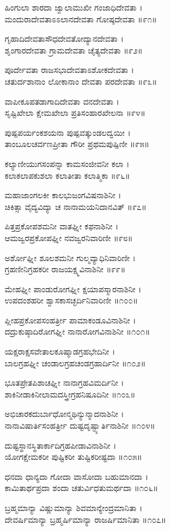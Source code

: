 ಹಿಂಗುಲಾ ಶಾರದಾ ಜ್ವಾಲಾಮುಖೀ ಗಂಜಾಧಿದೇವತಾ ।\\
ಮಂದುರಾದೇವತಾಽಽಲಾನದೇವತಾ ಗೋಷ್ಠದೇವತಾ ॥೯೧॥

ಗೃಹಾದಿದೇವತಾಸೌಧದೇವತೋದ್ಯಾನದೇವತಾ ।\\
ಶೃಂಗಾರದೇವತಾ ಗ್ರಾಮದೇವತಾ ಚೈತ್ಯದೇವತಾ ॥೯೨॥

ಪೂರ್ದೇವತಾ ರಾಜಸಭಾದೇವತಾಽಶೋಕದೇವತಾ ।\\
ಚತುರ್ದಶಾನಾಂ ಲೋಕಾನಾಂ ದೇವತಾ ಪರದೇವತಾ ॥೯೩॥

ವಾಪೀಕೂಪತಡಾಗಾದಿದೇವತಾ ವನದೇವತಾ ।\\
ಸೃಷ್ಟಿಖೇಲಾ ಕ್ಷೇಮಖೇಲಾ ಪ್ರತಿಸಂಹಾರಖೇಲನಾ ॥೯೪॥

ಪುಷ್ಪಪರ್ಯಂಕಶಯನಾ ಪುಷ್ಪವತ್ಕುಂಡಲದ್ವಯೀ ।\\
ತಾಂಬೂಲಚರ್ವಣಪ್ರೀತಾ ಗೌರೀ ಪ್ರಥಮಪುಷ್ಪಿಣೀ ॥೯೫॥

ಕಲ್ಯಾಣೀಯುಗಸಂಪನ್ನಾ ಕಾಮಸಂಜೀವನೀ ಕಲಾ ।\\
ಕಲಾಕಲಾಪಕುಶಲಾ ಕಲಾತೀತಾ ಕಲಾತ್ಮಿಕಾ ॥೯೬॥

ಮಹಾಜಾಂಗಲಕೀ ಕಾಲಭುಜಂಗವಿಷನಾಶಿನೀ ।\\
ಚಿಕಿತ್ಸಾ ವೈದ್ಯವಿದ್ಯಾ ಚ ನಾನಾಮಯನಿದಾನವಿತ್ ॥೯೭॥

ಪಿತ್ತಪ್ರಕೋಪಶಮನೀ ವಾತಘ್ನೀ ಕಫನಾಶಿನೀ ।\\
ಆಮಜ್ವರಪ್ರಕೋಪಘ್ನೀ ನವಜ್ವರನಿವಾರಿಣೀ ॥೯೮॥

ಅರ್ಶೋಘ್ನೀ ಶೂಲಶಮನೀ ಗುಲ್ಮವ್ಯಾಧಿನಿವಾರಿಣೀ ।\\
ಗ್ರಹಣೀನಿಗ್ರಹಕರೀ ರಾಜಯಕ್ಷ್ಮವಿನಾಶಿನೀ ॥೯೯॥

ಮೇಹಘ್ನೀ ಪಾಂಡುರೋಗಘ್ನೀ ಕ್ಷಯಾಪಸ್ಮಾರನಾಶಿನೀ ।\\
ಉಪದಂಶಹರೀ ಶ್ವಾಸಕಾಸಚ್ಛರ್ದಿನಿವಾರಿಣೀ ॥೧೦೦॥

ಪ್ಲೀಹಪ್ರಕೋಪಸಂಹರ್ತ್ರೀ ಪಾಮಾಕಂಡೂವಿನಾಶಿನೀ ।\\
ದದ್ರುಕುಷ್ಠಾದಿರೋಗಘ್ನೀ ನಾನಾರೋಗವಿನಾಶಿನೀ ॥೧೦೧॥

ಯಕ್ಷರಾಕ್ಷಸವೇತಾಲಕೂಷ್ಮಾಡಗ್ರಹಭೇದಿನೀ ।\\
ಬಾಲಗ್ರಹಘ್ನೀ ಚಂಡಾಲಗ್ರಹಚಂಡಗ್ರಹಾರ್ದಿನೀ ॥೧೦೨॥

ಭೂತಪ್ರೇತಪಿಶಾಚಘ್ನೀ ನಾನಾಗ್ರಹವಿಮರ್ದಿನೀ ।\\
ಶಾಕಿನೀಡಾಕಿನೀಲಾಮದಸ್ತ್ರೀಗ್ರಹನಿಷೂದಿನೀ ॥೧೦೩॥

ಅಭಿಚಾರಕದುರ್ಬಾಧೋನ್ಮಥಿನ್ಯುನ್ಮಾದನಾಶಿನೀ ।\\
ನಾನಾವಿಷಾರ್ತಿಸಂಹರ್ತ್ರೀ ದುಷ್ಟದೃಷ್ಟ್ಯಾರ್ತಿನಾಶಿನೀ ॥೧೦೪॥

ದುಷ್ಟಸ್ಥಾನಸ್ಥಿತಾರ್ಕಾದಿಗ್ರಹಪೀಡಾವಿನಾಶಿನೀ ।\\
ಯೋಗಕ್ಷೇಮಕರೀ ಪುಷ್ಟಿಕರೀ ತುಷ್ಟಿಕರೀಷ್ಟದಾ ॥೧೦೫॥

ಧನದಾ ಧಾನ್ಯದಾ ಗೋದಾ ವಾಸೋದಾ ಬಹುಮಾನದಾ ।\\
ಕಾಮಿತಾರ್ಥಪ್ರದಾ ಶಂದಾ ಚತುರ್ವಿಧತುಮರ್ಥದಾ ॥೧೦೬॥

ಬ್ರಹ್ಮಮಾನ್ಯಾ ವಿಷ್ಣುಮಾನ್ಯಾ ಶಿವಮಾನ್ಯೇಂದ್ರಮಾನಿತಾ ।\\
ದೇವರ್ಷಿಮಾನ್ಯಾ ಬ್ರಹ್ಮರ್ಷಿಮಾನ್ಯಾ ರಾಜರ್ಷಿಮಾನಿತಾ ॥೧೦೭॥

